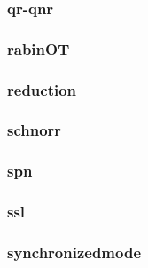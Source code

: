 \begin{frame}\frametitle{qr-qnr}
\begin{figure}
\begin{center}

\end{center}
\end{figure}
\end{frame}
\begin{frame}\frametitle{rabinOT}
\begin{figure}
\begin{center}

\end{center}
\end{figure}
\end{frame}
\begin{frame}\frametitle{reduction}
\begin{figure}
\begin{center}

\end{center}
\end{figure}
\end{frame}
\begin{frame}\frametitle{schnorr}
\begin{figure}
\begin{center}

\end{center}
\end{figure}
\end{frame}
\begin{frame}\frametitle{spn}
\begin{figure}
\begin{center}

\end{center}
\end{figure}
\end{frame}
\begin{frame}\frametitle{ssl}
\begin{figure}
\begin{center}

\end{center}
\end{figure}
\end{frame}
\begin{frame}\frametitle{synchronizedmode}
\begin{figure}
\begin{center}

\end{center}
\end{figure}
\end{frame}
